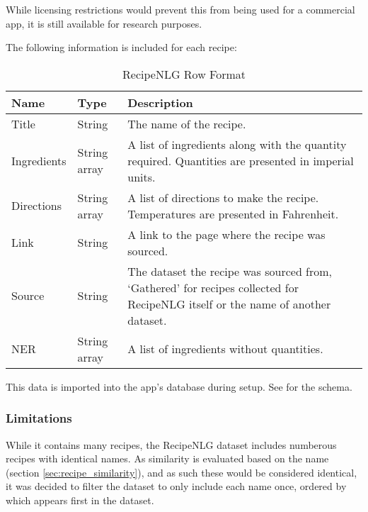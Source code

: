 While licensing restrictions would prevent this from being used for a commercial app, it is still available for
research purposes.

The following information is included for each recipe:

\begin{table}[h!]
    \caption{RecipeNLG Row Format}\label{tab:recipenlg_row_format}

    \begin{tabulary}{\textwidth}{llL}
        \toprule
        \textbf{Name} & \textbf{Type} & \textbf{Description} \\\midrule

        Title & String & The name of the recipe.\\

        Ingredients & String array & A list of ingredients along with the quantity required. Quantities are presented in imperial units.\\

        Directions & String array & A list of directions to make the recipe. Temperatures are presented in Fahrenheit.\\

        Link & String & A link to the page where the recipe was sourced.\\

        Source & String & The dataset the recipe was sourced from, \enquote*{Gathered} for recipes collected for RecipeNLG itself or the name of another dataset.\\

        NER & String array & A list of ingredients without quantities.\\
        \bottomrule
    \end{tabulary}
\end{table}

This data is imported into the app's database during setup. See  for the schema.


\subsubsection{Limitations}
While it contains many recipes, the RecipeNLG dataset includes numberous recipes with identical names.
As similarity is evaluated based on the name (section \ref{sec:recipe_similarity}), and as such
these would be considered identical, it was decided to filter the dataset to only include each name once,
ordered by which appears first in the dataset.

